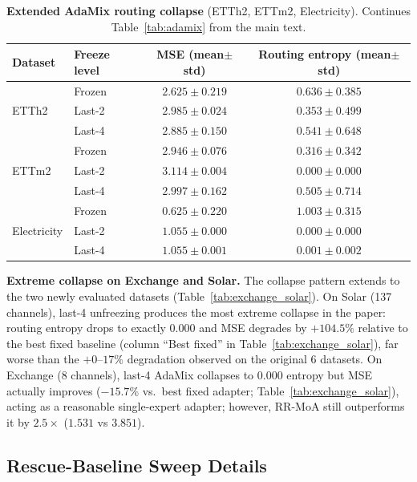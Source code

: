 \documentclass{article}
\begin{document}
\begin{table}[!htbp]
\centering
\caption{\textbf{Extended AdaMix routing collapse} (ETTh2, ETTm2, Electricity). Continues Table~\ref{tab:adamix} from the main text.}
\label{tab:adamix_extended}
\small
\begin{tabular}{@{}llcc@{}}
\toprule
Dataset & Freeze level & MSE (mean$\pm$std) & Routing entropy (mean$\pm$std) \\
\midrule
\multirow{3}{*}{ETTh2}
 & Frozen  & $2.625 \pm 0.219$ & $0.636 \pm 0.385$ \\
 & Last-2  & $2.985 \pm 0.024$ & $0.353 \pm 0.499$ \\
 & Last-4  & $2.885 \pm 0.150$ & $0.541 \pm 0.648$ \\
\midrule
\multirow{3}{*}{ETTm2}
 & Frozen  & $2.946 \pm 0.076$ & $0.316 \pm 0.342$ \\
 & Last-2  & $3.114 \pm 0.004$ & $\mathbf{0.000 \pm 0.000}$ \\
 & Last-4  & $2.997 \pm 0.162$ & $0.505 \pm 0.714$ \\
\midrule
\multirow{3}{*}{Electricity}
 & Frozen  & $0.625 \pm 0.220$ & $1.003 \pm 0.315$ \\
 & Last-2  & $1.055 \pm 0.000$ & $\mathbf{0.000 \pm 0.000}$ \\
 & Last-4  & $1.055 \pm 0.001$ & $0.001 \pm 0.002$ \\
\bottomrule
\end{tabular}
\end{table}

\textbf{Extreme collapse on Exchange and Solar.} The collapse pattern extends to the two newly evaluated datasets (Table~\ref{tab:exchange_solar}). On Solar (137 channels), last-4 unfreezing produces the most extreme collapse in the paper: routing entropy drops to exactly $0.000$ and MSE degrades by $+104.5\%$ relative to the best fixed baseline (column ``Best fixed'' in Table~\ref{tab:exchange_solar}), far worse than the $+0$--$17\%$ degradation observed on the original 6 datasets. On Exchange (8 channels), last-4 AdaMix collapses to $0.000$ entropy but MSE actually improves ($-15.7\%$ vs.\ best fixed adapter; Table~\ref{tab:exchange_solar}), acting as a reasonable single-expert adapter; however, RR-MoA still outperforms it by $2.5\times$ ($1.531$ vs $3.851$).

\subsection{Rescue-Baseline Sweep Details}
\label{app:rescue_details}
\end{document}
